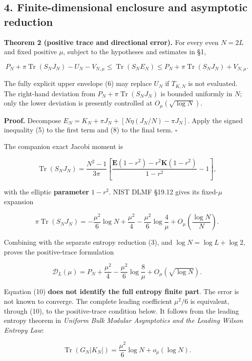 \documentclass[
  10pt,
  a4paper,
]{article}
\begin{document}
\subsection{4. Finite-dimensional enclosure and asymptotic reduction}\label{finite-dimensional-enclosure-and-asymptotic-reduction}

\textbf{Theorem 2 (positive trace and directional error).} For every even \(N=2L\) and fixed positive \(\mu\), subject to the hypotheses and estimates in §1,

\[
\boxed{
P_N+\pi\operatorname{Tr}(S_NJ_N)-U_N-V_{N,\mu}
\le\operatorname{Tr}(S_NE_N)
\le P_N+\pi\operatorname{Tr}(S_NJ_N)+V_{N,\mu}.}
\tag{9}
\]

The fully explicit upper envelope (6) may replace \(U_N\) if \(T_{K,N}\) is not evaluated. The right-hand deviation from \(P_N+\pi\operatorname{Tr}(S_NJ_N)\) is bounded uniformly in \(N\); only the lower deviation is presently controlled at \(O_\mu(\sqrt{\log N})\).

\textbf{Proof.} Decompose \(E_N=K_N+\pi J_N+[N\eta(J_N/N)-\pi J_N]\). Apply the signed inequality (5) to the first term and (8) to the final term. \(\square\)

The companion exact Jacobi moment is

\[
\operatorname{Tr}(S_NJ_N)
=\frac{N^2-1}{3\pi}
\left[\frac{\mathbf E(1-r^2)-r^2\mathbf K(1-r^2)}{1-r^2}-1\right],
\]

with the elliptic \textbf{parameter} \(1-r^2\). NIST DLMF §19.12 gives its fixed-\(\mu\) expansion

\[
\pi\operatorname{Tr}(S_NJ_N)
=-\frac{\mu^2}{6}\log N
+\frac{\mu^2}{4}-\frac{\mu^2}{6}\log\frac4\mu
+O_\mu\left(\frac{\log N}{N}\right).
\]

Combining with the separate entropy reduction (3), and \(\log N=\log L+\log2\), proves the positive-trace formulation

\[
\boxed{
\mathcal D_L(\mu)=P_N+\frac{\mu^2}{4}-\frac{\mu^2}{6}\log\frac8\mu
+O_\mu(\sqrt{\log N}).}
\tag{10}
\]

Equation (10) \textbf{does not identify the full entropy finite part}. The error is not known to converge. The complete leading coefficient \(\mu^2/6\) is equivalent, through (10), to the positive-trace condition below. It follows from the leading entropy theorem in \emph{Uniform Bulk Modular Asymptotics and the Leading Wilson Entropy Law}:

\[
\boxed{\operatorname{Tr}(G_N|K_N|)=\frac{\mu^2}{6}\log N+o_\mu(\log N).}
\tag{11}
\]
\end{document}
